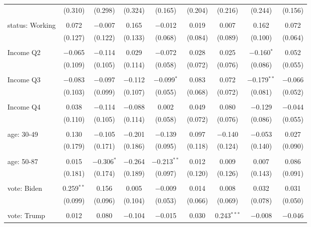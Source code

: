 \begin{tabular}{@{\extracolsep{5pt}}lcccccccc}
  & (0.310) & (0.298) & (0.324) & (0.165) & (0.204) & (0.216) & (0.244) & (0.156) \\ 
  & & & & & & & & \\ 
 status: Working & 0.072 & $-$0.007 & 0.165 & $-$0.012 & 0.019 & 0.007 & 0.162 & 0.072 \\ 
  & (0.127) & (0.122) & (0.133) & (0.068) & (0.084) & (0.089) & (0.100) & (0.064) \\ 
  & & & & & & & & \\ 
 Income Q2 & $-$0.065 & $-$0.114 & 0.029 & $-$0.072 & 0.028 & 0.025 & $-$0.160$^{*}$ & 0.052 \\ 
  & (0.109) & (0.105) & (0.114) & (0.058) & (0.072) & (0.076) & (0.086) & (0.055) \\ 
  & & & & & & & & \\ 
 Income Q3 & $-$0.083 & $-$0.097 & $-$0.112 & $-$0.099$^{*}$ & 0.083 & 0.072 & $-$0.179$^{**}$ & $-$0.066 \\ 
  & (0.103) & (0.099) & (0.107) & (0.055) & (0.068) & (0.072) & (0.081) & (0.052) \\ 
  & & & & & & & & \\ 
 Income Q4 & 0.038 & $-$0.114 & $-$0.088 & 0.002 & 0.049 & 0.080 & $-$0.129 & $-$0.044 \\ 
  & (0.110) & (0.105) & (0.114) & (0.058) & (0.072) & (0.076) & (0.086) & (0.055) \\ 
  & & & & & & & & \\ 
 age: 30-49 & 0.130 & $-$0.105 & $-$0.201 & $-$0.139 & 0.097 & $-$0.140 & $-$0.053 & 0.027 \\ 
  & (0.179) & (0.171) & (0.186) & (0.095) & (0.118) & (0.124) & (0.140) & (0.090) \\ 
  & & & & & & & & \\ 
 age: 50-87 & 0.015 & $-$0.306$^{*}$ & $-$0.264 & $-$0.213$^{**}$ & 0.012 & 0.009 & 0.007 & 0.086 \\ 
  & (0.181) & (0.174) & (0.189) & (0.097) & (0.120) & (0.126) & (0.143) & (0.091) \\ 
  & & & & & & & & \\ 
 vote: Biden & 0.259$^{**}$ & 0.156 & 0.005 & $-$0.009 & 0.014 & 0.008 & 0.032 & 0.031 \\ 
  & (0.099) & (0.096) & (0.104) & (0.053) & (0.066) & (0.069) & (0.078) & (0.050) \\ 
  & & & & & & & & \\ 
 vote: Trump & 0.012 & 0.080 & $-$0.104 & $-$0.015 & 0.030 & 0.243$^{***}$ & $-$0.008 & $-$0.046 \\ 

\end{tabular}
